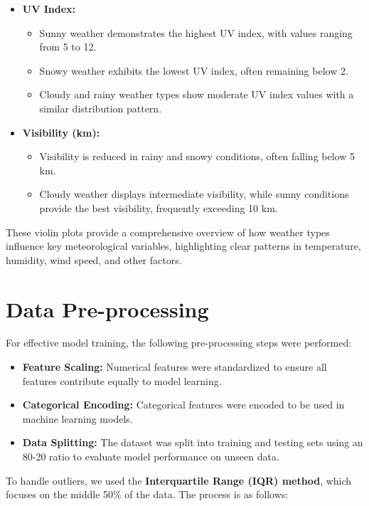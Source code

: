 \documentclass{article}
\begin{document}
\begin{itemize}
    \item \textbf{UV Index:}
    \begin{itemize}
        \item Sunny weather demonstrates the highest UV index, with values ranging from 5 to 12.
        \item Snowy weather exhibits the lowest UV index, often remaining below 2.
        \item Cloudy and rainy weather types show moderate UV index values with a similar distribution pattern.
    \end{itemize}

    \item \textbf{Visibility (km):}
    \begin{itemize}
        \item Visibility is reduced in rainy and snowy conditions, often falling below 5 km.
        \item Cloudy weather displays intermediate visibility, while sunny conditions provide the best visibility, frequently exceeding 10 km.
    \end{itemize}
\end{itemize}

These violin plots provide a comprehensive overview of how weather types influence key meteorological variables, highlighting clear patterns in temperature, humidity, wind speed, and other factors.


\section{Data Pre-processing}
For effective model training, the following pre-processing steps were performed:

\begin{itemize}
\item \textbf{Feature Scaling:} Numerical features were standardized to ensure all features contribute equally to model learning.
\item \textbf{Categorical Encoding:} Categorical features were encoded to be used in machine learning models.
\item \textbf{Data Splitting:} The dataset was split into training and testing sets using an 80-20 ratio to evaluate model performance on unseen data.
\end{itemize}

To handle outliers, we used the \textbf{Interquartile Range (IQR) method}, which focuses on the middle 50\% of the data. The process is as follows:
\end{document}
